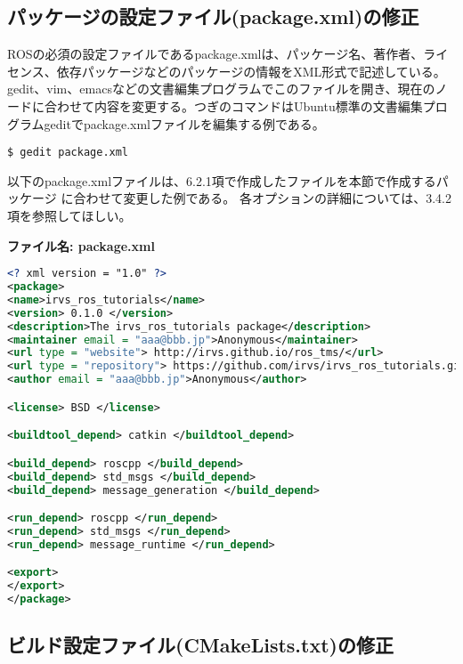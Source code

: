 \subsection{パッケージの設定ファイル(package.xml)の修正}

ROSの必須の設定ファイルであるpackage.xmlは、パッケージ名、著作者、ライセンス、依存パッケージなどのパッケージの情報をXML形式で記述している。gedit、vim、emacsなどの文書編集プログラムでこのファイルを開き、現在のノードに合わせて内容を変更する。つぎのコマンドはUbuntu標準の文書編集プログラムgeditでpackage.xmlファイルを編集する例である。

\begin{lstlisting}[language=ROS]
$ gedit package.xml
\end{lstlisting}

以下のpackage.xmlファイルは、6.2.1項で作成したファイルを本節で作成するパッケージ  に合わせて変更した例である。  各オプションの詳細については、3.4.2項を参照してほしい。

\noindent\textbf{ファイル名: package.xml}
\begin{lstlisting}[language=XML]
<? xml version = "1.0" ?>
<package>
<name>irvs_ros_tutorials</name>
<version> 0.1.0 </version>
<description>The irvs_ros_tutorials package</description>
<maintainer email = "aaa@bbb.jp">Anonymous</maintainer>
<url type = "website"> http://irvs.github.io/ros_tms/</url>
<url type = "repository"> https://github.com/irvs/irvs_ros_tutorials.git </url>
<author email = "aaa@bbb.jp">Anonymous</author>

<license> BSD </license>

<buildtool_depend> catkin </buildtool_depend>

<build_depend> roscpp </build_depend>
<build_depend> std_msgs </build_depend>
<build_depend> message_generation </build_depend>

<run_depend> roscpp </run_depend>
<run_depend> std_msgs </run_depend>
<run_depend> message_runtime </run_depend>

<export>
</export>
</package>
\end{lstlisting}

\subsection{ビルド設定ファイル(CMakeLists.txt)の修正}

